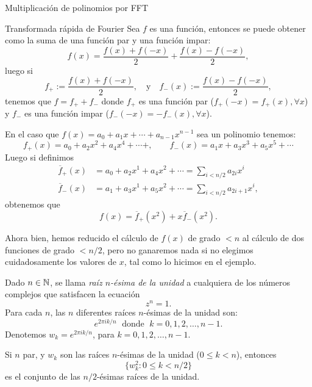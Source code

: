 \begin{chapter}{Multiplicación de polinomios por FFT}
\begin{section}{Transformada rápida de Fourier}
    Sea  $f$  es una función, entonces se puede obtener como la suma de una función par y una función impar: 
    $$
    f(x) = \frac{f(x) + f(-x)}{2} + \frac{f(x) - f(-x)}{2},  
    $$
    luego si
    $$
    f_+ := \frac{f(x) + f(-x)}{2}, \quad \text{y} \quad f_-(x):= \frac{f(x) - f(-x)}{2},  
    $$  
    tenemos que $f = f_+ + f_-$ donde $f_+$ es una función par ($f_+(-x) = f_+(x), \forall x$) y   $f_-$ es una función impar ($f_-(-x) = -f_-(x), \forall x$).
    
    En  el caso que $f(x)= a_0 + a_1x + \cdots + a_{n-1}x^{n-1}$ sea un polinomio tenemos:
    $$
    f_+(x) = a_0 + a_2 x^2 + a_4 x^4 + \cdots + , \qquad f_-(x) = a_1x + a_3 x^3 + a_5 x^5 + \cdots
    $$
    Luego  si definimos 
    \begin{align*}
        \overline{f}_+(x) &= a_0 + a_2 x^1 + a_4 x^2 + \cdots = \sum_{i<n/2} a_{2i}x^i \\
        \overline{f}_-(x) &= a_1 + a_3 x^1 + a_5 x^2 + \cdots= \sum_{i<n/2} a_{2i+1}x^i, 
    \end{align*}
    obtenemos que 
    \begin{equation*}
        f(x) = \overline{f}_+(x^2) + x \overline{f}_-(x^2).
    \end{equation*}

    Ahora bien,  hemos reducido el cálculo de $f(x)$ de grado $<n$ al cálculo de dos funciones de grado $< n/2$, pero no ganaremos nada si no elegimos cuidadosamente los valores de $x$, tal como lo  hicimos en el ejemplo. 

    \begin{definicion}
        Dado $n \in \mathbb N$, se llama \textit{raíz $n$-ésima de la unidad} a cualquiera de los números complejos que satisfacen la ecuación 
        $$
        z^n = 1.
        $$ 
        Para cada $n$, las $n$ diferentes raíces $n$-ésimas de la unidad son:
        $$
        e^{2 \pi i k/n} \;\text{ donde }\;  k = 0, 1, 2, \ldots, n-1.
        $$
        Denotemos $w_k = e^{2 \pi i k/n}$, para $ k = 0, 1, 2, \ldots, n-1$. 
    \end{definicion}

    \begin{observacion}\label{obs-raices-unidad-div-2} Si $n$ par,  y $w_k$ son las raíces $n$-ésimas de la unidad ($ 0 \le k <n$),  entonces 
    $$
    \{w_k^2: 0 \le k < {n}/{2}\}
    $$
    es el conjunto de las $n/2$-ésimas  raíces de la unidad.  
    \end{observacion}



\end{section}
\end{chapter}
